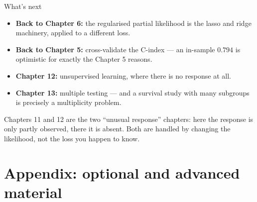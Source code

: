 \documentclass[aspectratio=169,11pt]{beamer}
\begin{document}
\begin{frame}{What's next}
  \footnotesize
  \begin{readme}
    \begin{itemize}
      \item \textbf{Back to Chapter 6:} the regularised partial likelihood is the lasso
            and ridge machinery, applied to a different loss.
      \item \textbf{Back to Chapter 5:} cross-validate the C-index --- an in-sample
            $0.794$ is optimistic for exactly the Chapter 5 reasons.
      \item \textbf{Chapter 12:} unsupervised learning, where there is no response at all.
      \item \textbf{Chapter 13:} multiple testing --- and a survival study with many
            subgroups is precisely a multiplicity problem.
    \end{itemize}
  \end{readme}
  \begin{takeaway}
    Chapters 11 and 12 are the two ``unusual response'' chapters: here the response
    is only partly observed, there it is absent. Both are handled by changing the
    likelihood, not the loss you happen to know.
  \end{takeaway}
\end{frame}

\appendix
\AtBeginSection[]{}
\section{Appendix: optional and advanced material}
\end{document}
